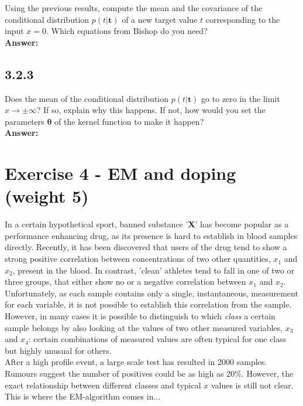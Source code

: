 \documentclass[a4paper]{article}
\begin{document}
Using the previous results, compute the mean and the covariance of the conditional distribution $p(t | \textbf{t})$ of a new target value $t$ corresponding to the input $x = 0$. Which equations from Bishop do you need?\\

\textbf{Answer:}\\







\subsection*{3.2.3}

Does the mean of the conditional distribution $p(t | \textbf{t})$ go to zero in the limit $x \to \pm \infty$? If so, explain why this happens. If not, how would you set the parameters $\boldsymbol{\theta}$ of the kernel function to make it happen?\\

\textbf{Answer:}\\

 


\section*{Exercise 4 - EM and doping (weight 5)}

In a certain hypothetical sport, banned substance '\textbf{X}' has become popular as a performance enhancing drug, as its presence is hard to establish in blood samples directly. Recently, it has been discovered that users of the drug tend to show a strong positive correlation between concentrations of two other quantities, $x_1$ and $x_2$, present in the blood. In contrast, 'clean' athletes tend to fall in one of two or three groups, that either show no or a negative correlation between $x_1$ and $x_2$. Unfortunately, as each sample contains only a single, instantaneous, measurement for each variable, it is not possible to establish this correlation from the sample. However, in many cases it is possible to distinguish to which \textit{class} a certain sample belongs by also looking at the values of two other measured variables, $x_3$ and $x_4$: certain combinations of measured values are often typical for one class but highly unusual for others.\\
After a high profile event, a large scale test has resulted in 2000 samples. Rumours suggest the number of positives could be as high as 20\%. However, the exact relationship between different classes and typical $x$ values is still not clear. This is where the EM-algorithm comes in...\\
\end{document}
